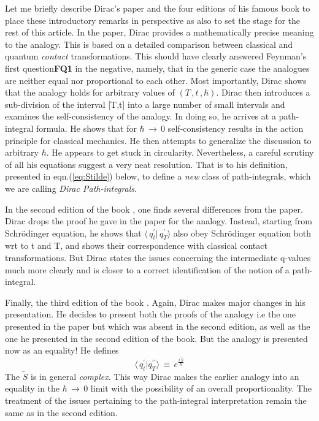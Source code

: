 \documentclass[a4paper]{JHEP3}
\newcommand{\be}{\begin{equation}}
\newcommand{\ee}{\end{equation}}
\begin{document}
Let me briefly describe Dirac's paper \cite{diracpaper} and the four editions of his famous book 
\cite{diracbook1,diracbook2,diracbook3,diracbook4,diracbook4r} to place these introductory remarks in perspective as also
to set the stage for the rest of this article. In the paper, Dirac provides a mathematically precise meaning to the analogy. This is 
based on a detailed comparison between classical and quantum {\it contact} transformations. This should have clearly answered Feynman's first 
question{\bf FQ1} in the negative, namely, that in the generic case the analogues are neither equal nor proportional to each other. 
Most importantly,
Dirac shows that the analogy holds for arbitrary values of $(T\,,t\,,\hbar)$. Dirac then introduces a sub-division of the interval [T,t] into a
large number of small intervals and examines the self-consistency of the analogy. In doing so, he arrives at a path-integral formula. He
shows that for $\hbar\,\rightarrow\,0$ self-consistency results in the action principle for classical mechanics. He then attempts to generalize
the discussion to arbitrary $\hbar$. He appears to get 
stuck in circularity. Nevertheless, a careful scrutiny of all his equations suggest a very neat resolution. That is to his definition, 
presented in eqn.(\ref{eq:Stilde}) below, to define a \emph{new} class of path-integrals, which we are calling {\it Dirac Path-integrals}.

In the second edition of the book \cite{diracbook2}, one finds several differences from the paper. Dirac drops the proof he gave in 
the paper for the analogy.
Instead, starting from Schr\"odinger equation, he shows that $\langle\,q_t^\prime|\,q_T^\prime\rangle$ also obey Schr\"odinger equation
both wrt to t and T, and shows their
correspondence with classical contact transformations. 
But Dirac states the issues concerning the intermediate 
q-values much more clearly and is closer to a correct identification of the notion of a path-integral.

Finally, the third edition of the book \cite{diracbook3}. Again, Dirac makes major changes in his presentation. He decides to present 
both the proofs of the analogy i.e the one presented in the paper but which was absent in the second edition, as well as the one he 
presented in the second edition of the book. But the analogy is presented now as an equality! He defines
\be
\label{eq:Stilde}
\langle\,q^\prime_t|q^{\prime\prime}_T\rangle\,
\equiv\,e^{\frac{i\,{\tilde S}}{\hbar}}
\ee
The ${\tilde S}$ is in general \emph{complex}.
This way Dirac makes the earlier analogy into an equality in the $\hbar\,\rightarrow\,0$ limit with the possibility of an overall 
proportionality. The treatment of the issues pertaining to the path-integral interpretation remain the same as in the second edition. 
\end{document}
